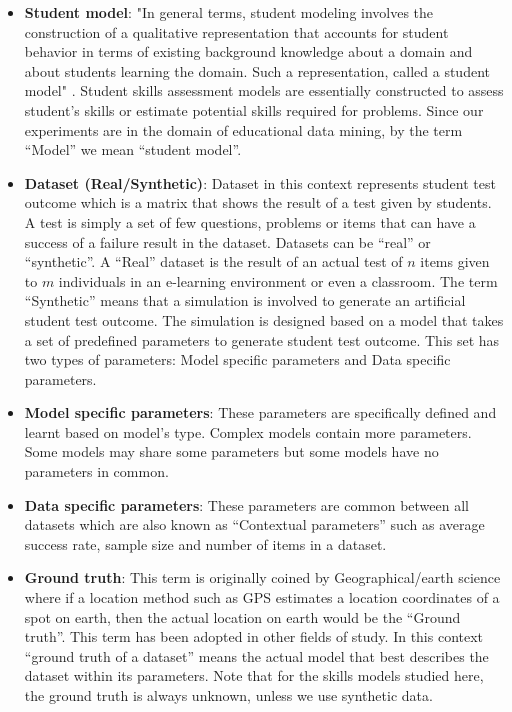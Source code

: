 \begin{itemize}
\item \textbf{Student model}: "In general terms, student modeling involves the construction of a qualitative representation that accounts for student behavior in terms of existing background knowledge about a domain and about students learning the domain. Such a representation, called a student model" \citep{sison1998student}. Student skills assessment models are essentially constructed to assess student's skills or estimate potential skills required for problems. Since our experiments are in the domain of educational data mining, by the term ``Model'' we mean ``student model''. 
\item \textbf{Dataset (Real/Synthetic)}: Dataset in this context represents student test outcome which is a matrix that shows the result of a test given by students. A test is simply a set of few questions, problems or items that can have a success of a failure result in the dataset. Datasets can be ``real'' or ``synthetic''. A ``Real'' dataset is the result of an actual test of $n$ items given to $m$ individuals in an e-learning environment or even a classroom. The term ``Synthetic'' means that a simulation is involved to generate an artificial student test outcome. The simulation is designed based on a model that takes a set of predefined parameters to generate student test outcome. This set has two types of parameters: Model specific parameters and Data specific parameters.
\item \textbf{Model specific parameters}: These parameters are specifically defined and learnt based on model's type. Complex models contain more parameters. Some models may share some parameters but some models have no parameters in common.
\item \textbf{Data specific parameters}: These parameters are common between all datasets which are also known as ``Contextual parameters'' such as average success rate, sample size and number of items in a dataset.
\item \textbf{Ground truth}: This term is originally coined by Geographical/earth science where if a location method such as GPS estimates a location coordinates of a spot on earth, then the actual location on earth would be the ``Ground truth''. This term has been adopted in other fields of study. In this context ``ground truth of a dataset'' means the actual model that best describes the dataset within its parameters. Note that for the skills models studied here, the ground truth is always unknown, unless we use synthetic data.

\end{itemize}
